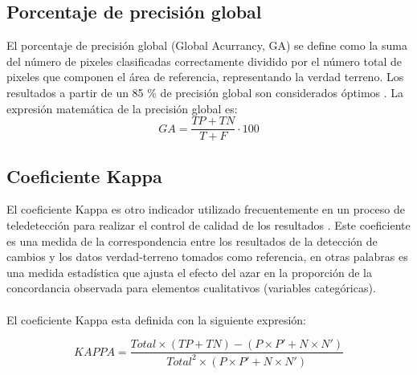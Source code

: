 \subsection{Porcentaje de precisi\'on global}\label{sec:pg}
El porcentaje de precisi\'on global (Global Acurrancy, GA) se define como la suma del n\'umero de pixeles clasificadas correctamente dividido por el n\'umero total de pixeles que componen el \'area de referencia, representando la verdad terreno. Los resultados a partir de un 85 \% de precisi\'on global son considerados \'optimos \cite{foody2002status}. La expresi\'on matem\'atica de la precisi\'on global es:
		\begin{equation}
		GA = \frac{TP+TN}{T+F}\cdot100
		\end{equation}
\subsection{Coeficiente Kappa}\label{sec:kappa}
El coeficiente Kappa es otro indicador utilizado frecuentemente en un proceso de teledetecci\'on para realizar el control de calidad de los resultados \cite{chuvieco1998factor}. Este coeficiente es una medida de la correspondencia entre los resultados de la detecci\'on de cambios y los datos verdad-terreno tomados como referencia, en otras palabras es una medida estad\'istica que ajusta el efecto del azar en la proporci\'on de la concordancia observada para elementos cualitativos (variables categ\'oricas).\\~\\
El coeficiente Kappa esta definida con la siguiente expresi\'on:

		\begin{equation}
		KAPPA=\dfrac{Total \times (TP+TN)-(P \times P'+N \times N')}{Total^{2} \times (P \times P'+N \times N')}
		\end{equation}
		
